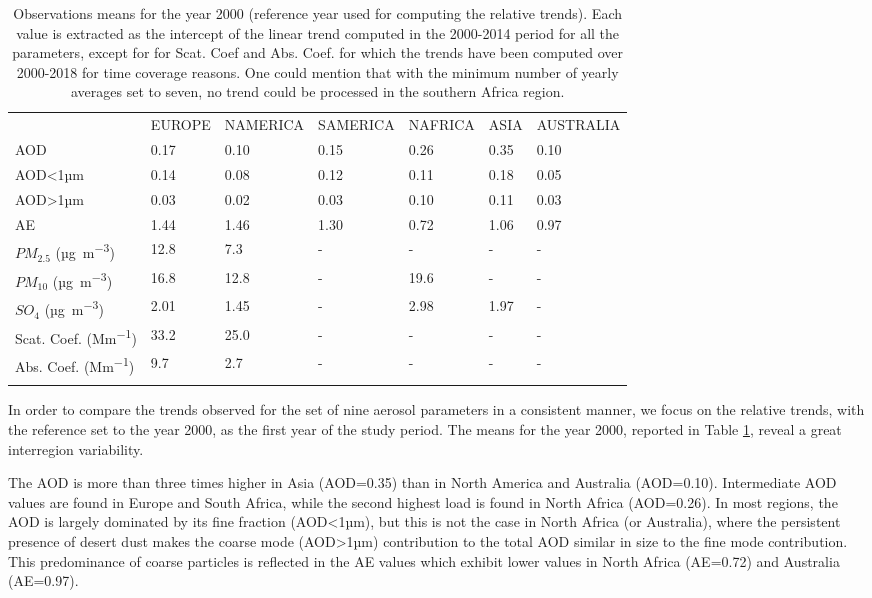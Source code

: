 \documentclass[journal abbreviation, manuscript]{copernicus}
\begin{document}
\begin{table}
 \begin{tabular}{lllllll}
  \tophline
                     & EUROPE & NAMERICA & SAMERICA & NAFRICA & ASIA & AUSTRALIA \\
  \middlehline
  AOD                & 0.17   & 0.10     & 0.15     & 0.26    & 0.35 & 0.10      \\
  AOD<1µm            & 0.14   & 0.08     & 0.12     & 0.11    & 0.18 & 0.05      \\
  AOD>1µm            & 0.03   & 0.02     & 0.03     & 0.10    & 0.11 & 0.03      \\
  AE                 & 1.44   & 1.46     & 1.30     & 0.72    & 1.06 & 0.97      \\
  $PM_{2.5}$ (\unit{µg.m^{-3}})     & 12.8   & 7.3      & -        & -       & -    & -         \\
  $PM_{10}$ (\unit{µg.m^{-3}})      & 16.8   & 12.8     & -        & 19.6    & -    & -         \\
  $SO_{4}$ (\unit{µg.m^{-3}})       & 2.01   & 1.45     & -        & 2.98    & 1.97 & -         \\
  Scat. Coef. (\unit{Mm^{-1}}) & 33.2   & 25.0     & -        & -       & -    & -         \\
  Abs. Coef. (\unit{Mm^{-1}})  & 9.7    & 2.7      & -        & -       & -    & -         \\
  \bottomhline
 \end{tabular}

 \caption{Observations means for the year 2000 (reference year used for computing the relative trends). Each value is extracted as the intercept of the linear trend computed in the 2000-2014 period for all the parameters, except for for Scat. Coef and Abs. Coef. for which the trends have been computed over 2000-2018 for time coverage reasons. One could mention that with the minimum number of yearly averages set to seven, no trend could be processed in the southern Africa region.}
 \label{table:obs_2000mean}
\end{table}

In order to compare the trends observed for the set of nine aerosol parameters in a consistent manner, we focus on the relative trends, with the reference set to the year 2000, as the first year of the study period. The means for the year 2000, reported in Table \ref{table:obs_2000mean}, reveal a great interregion variability.

The AOD is more than three times higher in Asia (AOD=0.35) than in North America and Australia (AOD=0.10). Intermediate AOD values are found in Europe and South Africa, while the second highest load is found in North Africa (AOD=0.26). In most regions, the AOD is largely dominated by its fine fraction (AOD<1µm), but this is not the case in North Africa (or Australia), where the persistent presence of desert dust makes the coarse mode (AOD>1µm) contribution to the total AOD similar in size to the fine mode contribution. This predominance of coarse particles is reflected in the AE values which exhibit lower values in North Africa (AE=0.72) and Australia (AE=0.97).
\end{document}
